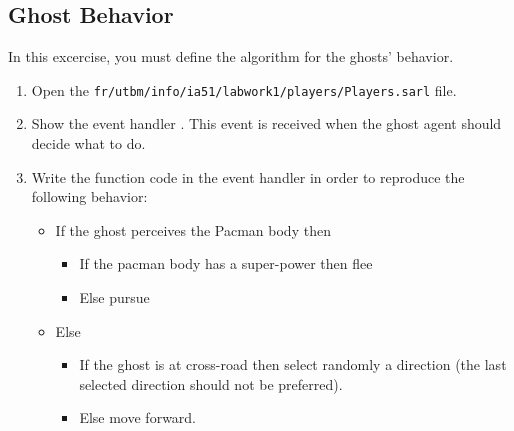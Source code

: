 \documentclass[article,english,nodocumentinfo]{multiagentfrreport}
\begin{document}
\subsection{Ghost Behavior}

In this excercise, you must define the algorithm for the ghosts' behavior.
\begin{enumerate}
\item Open the \texttt{fr/utbm/info/ia51/labwork1/players/Players.sarl} file.
\item Show the event handler . This event is received when the ghost agent should decide what to do.
\item Write the function code in the event handler in order to reproduce the following behavior:
	\begin{itemize}
	\item If the ghost perceives the Pacman body then
		\begin{itemize}
		\item If the pacman body has a super-power then flee
		\item Else pursue
		\end{itemize}
	\item Else
		\begin{itemize}
		\item If the ghost is at cross-road then select randomly a direction (the last selected direction should not be preferred).
		\item Else move forward.
		\end{itemize}
	\end{itemize}
\end{enumerate}
\end{document}
